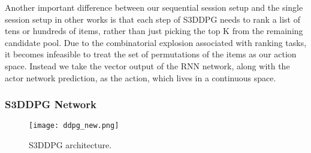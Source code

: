 Another important difference between our sequential session setup and the single session setup in other works is that each step of S3DDPG needs to rank a list of tens or hundreds of items, rather than just picking the top K from the remaining candidate pool. Due to the combinatorial explosion associated with ranking tasks, it becomes infeasible to treat the set of permutations of the items as our action space. Instead we take the vector output of the RNN network, along with the actor network prediction, as the action, which lives in a continuous space.



\subsubsection{S3DDPG Network}

\begin{figure}
    \centering
    \texttt{[image: ddpg\_new.png]}
    \centering
    \caption{S3DDPG architecture.}
    \label{fig:ddpg}
\end{figure}

